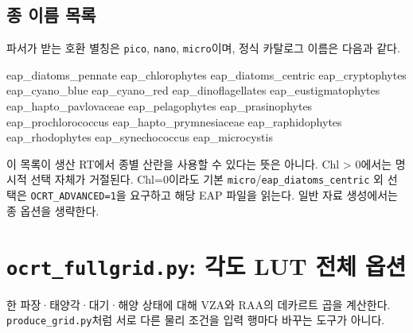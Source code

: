 \subsection{종 이름 목록}
\label{sec:auto:06_python_batch:5.1}
파서가 받는 호환 별칭은 \texttt{pico}, \texttt{nano}, \texttt{micro}이며, 정식 카탈로그 이름은 다음과 같다.


\begin{ManualCode}
eap_diatoms_pennate        eap_chlorophytes        eap_diatoms_centric
eap_cryptophytes           eap_cyano_blue         eap_cyano_red
eap_dinoflagellates        eap_eustigmatophytes   eap_hapto_pavlovaceae
eap_pelagophytes           eap_prasinophytes      eap_prochlorococcus
eap_hapto_prymnesiaceae     eap_raphidophytes      eap_rhodophytes
eap_synechococcus          eap_microcystis
\end{ManualCode}

이 목록이 생산 RT에서 종별 산란을 사용할 수 있다는 뜻은 아니다. Chl > 0에서는 명시적 선택 자체가 거절된다. Chl=0이라도 기본 \texttt{micro}/\texttt{eap\_\allowbreak{}diatoms\_\allowbreak{}centric} 외 선택은 \texttt{OCRT\_\allowbreak{}ADVANCED=\allowbreak{}1}을 요구하고 해당 EAP 파일을 읽는다. 일반 자료 생성에서는 종 옵션을 생략한다.

\section{\texttt{ocrt\_\allowbreak{}fullgrid.\allowbreak{}py}: 각도 LUT 전체 옵션}
\label{sec:auto:06_python_batch:6}
한 파장·태양각·대기·해양 상태에 대해 VZA와 RAA의 데카르트 곱을 계산한다. \texttt{produce\_\allowbreak{}grid.\allowbreak{}py}처럼 서로 다른 물리 조건을 입력 행마다 바꾸는 도구가 아니다.


